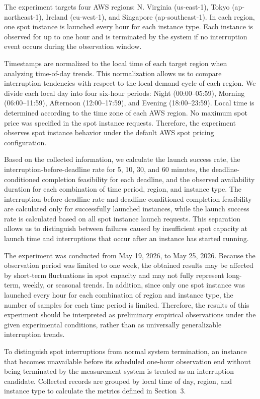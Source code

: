 \documentclass[runningheads]{llncs}
\begin{document}
The experiment targets four AWS regions: N. Virginia (us-east-1), Tokyo (ap-northeast-1), Ireland (eu-west-1), and Singapore (ap-southeast-1). In each region, one spot instance is launched every hour for each instance type. Each instance is observed for up to one hour and is terminated by the system if no interruption event occurs during the observation window.

Timestamps are normalized to the local time of each target region when analyzing time-of-day trends. This normalization allows us to compare interruption tendencies with respect to the local demand cycle of each region. We divide each local day into four six-hour periods: Night (00:00--05:59), Morning (06:00--11:59), Afternoon (12:00--17:59), and Evening (18:00--23:59). Local time is determined according to the time zone of each AWS region. No maximum spot price was specified in the spot instance requests. Therefore, the experiment observes spot instance behavior under the default AWS spot pricing configuration.

Based on the collected information, we calculate the launch success rate, the interruption-before-deadline rate for 5, 10, 30, and 60 minutes, the deadline-conditioned completion feasibility for each deadline, and the observed availability duration for each combination of time period, region, and instance type. The interruption-before-deadline rate and deadline-conditioned completion feasibility are calculated only for successfully launched instances, while the launch success rate is calculated based on all spot instance launch requests. This separation allows us to distinguish between failures caused by insufficient spot capacity at launch time and interruptions that occur after an instance has started running.

The experiment was conducted from May 19, 2026, to May 25, 2026. Because the observation period was limited to one week, the obtained results may be affected by short-term fluctuations in spot capacity and may not fully represent long-term, weekly, or seasonal trends. In addition, since only one spot instance was launched every hour for each combination of region and instance type, the number of samples for each time period is limited. Therefore, the results of this experiment should be interpreted as preliminary empirical observations under the given experimental conditions, rather than as universally generalizable interruption trends.

To distinguish spot interruptions from normal system termination, an instance that becomes unavailable before its scheduled one-hour observation end without being terminated by the measurement system is treated as an interruption candidate. Collected records are grouped by local time of day, region, and instance type to calculate the metrics defined in Section~3.
\end{document}
